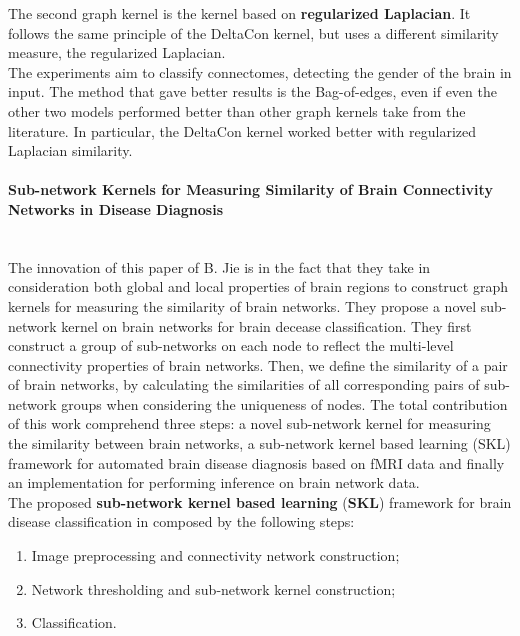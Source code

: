 The second graph kernel is the kernel based on \textbf{regularized Laplacian}. It follows the same principle of the DeltaCon kernel, but uses a different similarity measure, the regularized Laplacian.
\\

The experiments aim to classify connectomes, detecting the gender of the brain in input. The method that gave better results is the Bag-of-edges, even if even the other two models performed better than other graph kernels take from the literature. In particular, the DeltaCon kernel worked better with regularized Laplacian similarity.

\paragraph{Sub-network Kernels for Measuring Similarity of Brain Connectivity Networks in Disease Diagnosis}\
\\

The innovation of this paper of B. Jie \cite{Jie2018} is in the fact that they take in consideration both global and local properties of brain regions to construct graph kernels for measuring the similarity of brain networks. They propose a novel sub-network kernel on brain networks for brain decease classification. They first construct a group of sub-networks on each node to reflect the multi-level connectivity properties of brain networks. Then, we define the similarity of a pair of brain networks, by calculating the similarities of all corresponding pairs of sub-network groups when considering the uniqueness of nodes. The total contribution of this work comprehend three steps: a novel sub-network kernel for measuring the similarity between brain networks, a sub-network kernel based learning (SKL) framework for automated brain disease diagnosis based on fMRI data and finally an implementation for performing inference on brain network data.
\\

The proposed \textbf{sub-network kernel based learning} (\textbf{SKL}) framework for brain disease classification in composed by the following steps: 

\begin{enumerate}
	\item Image preprocessing and connectivity network construction;
	\item Network thresholding and sub-network kernel construction;
	\item Classification.
\end{enumerate}

